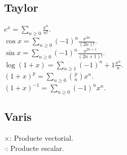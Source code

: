 \subsection{Taylor}
\ci $e^x = \sum_{n\geq 0} \frac{x^n}{n!}$. \\
\ci $\cos x = \sum_{n\geq 0} (-1)^n \frac{x^{2n}}{(2n)!}$. \\
\ci $\sin x = \sum_{n\geq 0} (-1)^n \frac{x^{2n+1}}{(2n+1)!}$. \\
\ci $\log (1+x) = \sum_{n\geq 1} (-1)^n+1 \frac{x^n}{n}$. \\
\ci $(1+x)^p = \sum_{n\geq 0} \binom{p}{n} x^n$. \\
\ci $(1+x)^{-1} = \sum_{n\geq 0} (-1)^n x^n$.

\subsection{Varis}
\u{$\times$}: Producte vectorial. \\
\u{$\cdot$}: Producte escalar.